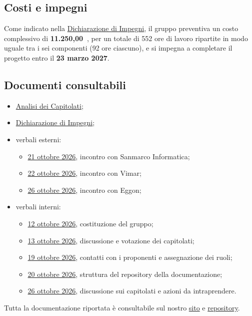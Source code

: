\documentclass[lettera]{gpt}
\newcommand{\pdfdoc}[2]{\href{https://github.com/Git-Push-Team/docs/blob/main/Candidatura/#1}{#2}}
\begin{document}
\subsection*{Costi e impegni}

Come indicato nella
\pdfdoc{documenti/esterni/dichiarazione-di-impegni/Dichiarazione\%20di\%20Impegni.pdf}{Dichiarazione di Impegni},
il gruppo preventiva un costo complessivo di \textbf{11.250,00~\texteuro},
per un totale di 552 ore di lavoro ripartite in modo uguale tra i sei
componenti (92 ore ciascuno), e si impegna a completare il progetto entro
il \textbf{23 marzo 2027}.

\subsection*{Documenti consultabili}

\begin{itemize}
  \item \pdfdoc{documenti/esterni/analisi-dei-capitolati/analisi-dei-capitolati.pdf}{Analisi dei Capitolati};
  \item \pdfdoc{documenti/esterni/dichiarazione-di-impegni/Dichiarazione\%20di\%20Impegni.pdf}{Dichiarazione di Impegni};
  \item verbali esterni:
    \begin{itemize}
      \item \pdfdoc{verbali/esterni/VE-2026-10-21.pdf}{21 ottobre 2026}, incontro con Sanmarco Informatica;
      \item \pdfdoc{verbali/esterni/VE-2026-10-22.pdf}{22 ottobre 2026}, incontro con Vimar;
      \item \pdfdoc{verbali/esterni/VE-2026-10-26.pdf}{26 ottobre 2026}, incontro con Eggon;
    \end{itemize}
  \item verbali interni:
    \begin{itemize}
      \item \pdfdoc{verbali/interni/VI-2026-10-12.pdf}{12 ottobre 2026}, costituzione del gruppo;
      \item \pdfdoc{verbali/interni/VI-2026-10-13.pdf}{13 ottobre 2026}, discussione e votazione dei capitolati;
      \item \pdfdoc{verbali/interni/VI-2026-10-19.pdf}{19 ottobre 2026}, contatti con i proponenti e assegnazione dei ruoli;
      \item \pdfdoc{verbali/interni/VI-2026-10-20.pdf}{20 ottobre 2026}, struttura del repository della documentazione;
      \item \pdfdoc{verbali/interni/VI-2026-10-26.pdf}{26 ottobre 2026}, discussione sui capitolati e azioni da intraprendere.
    \end{itemize}
\end{itemize}
Tutta la documentazione riportata è consultabile sul nostro \href{https://git-push-team.github.io/docs/}{sito} e \href{https://github.com/Git-Push-Team/docs}{repository}.
\end{document}
